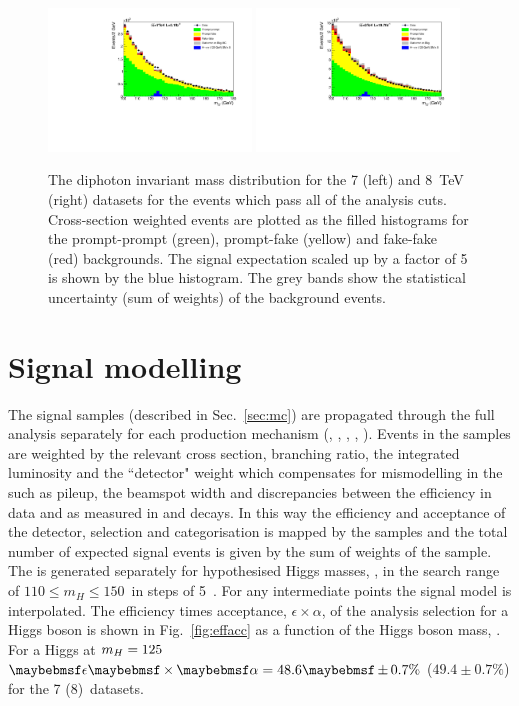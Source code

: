 \begin{figure}
  \includegraphics[width=0.48\textwidth]{analysis/plots/mgg_bkg_7TeV.pdf}
  \includegraphics[width=0.48\textwidth]{analysis/plots/mgg_bkg_8TeV.pdf}
  \caption[Diphoton invariant mass distributions for the datasets at 7 and 8~TeV]{The diphoton invariant mass distribution for the 7 (left) and 8~TeV (right) datasets for the events which pass all of the analysis cuts. Cross-section weighted \MC events are plotted as the filled histograms for the prompt-prompt (green), prompt-fake (yellow) and fake-fake (red) backgrounds. The \SM signal expectation scaled up by a factor of 5 is shown by the blue histogram. The grey bands show the statistical uncertainty (sum of weights) of the background \MC events.}
  \label{fig:inv_mass_plots}
\end{figure}

\section{Signal modelling}
\label{sec:signal_model}

The signal \MC samples (described in Sec.~\ref{sec:mc}) are propagated through the full analysis separately for each production mechanism (\ggH, \VBF, \WH, \ZH, \ttH). Events in the samples are weighted by the relevant \SM cross section, branching ratio, the integrated luminosity and the ``detector" weight which compensates for mismodelling in the \MC such as pileup, the beamspot width and discrepancies between the efficiency in data and \MC as measured in \Zee and \Zmumugamma decays. In this way the efficiency and acceptance of the detector, selection and categorisation is mapped by the \MC samples and the total number of expected \SM signal events is given by the sum of weights of the sample. The \MC is generated separately for hypothesised Higgs masses, \mH, in the search range of $110 \leq m_{H} \leq 150$~\GeV in steps of 5~\GeV. For any intermediate points the signal model is interpolated. The efficiency times acceptance, $\epsilon\times\alpha$, of the analysis selection for a \SM Higgs boson is shown in Fig.~\ref{fig:effacc} as a function of the Higgs boson mass, \mH. For a Higgs at $m_{H}=125$~\GeV $\ea=48.6\pm 0.7\%$ ($49.4\pm 0.7\%$) for the 7 (8)~\TeV datasets.

